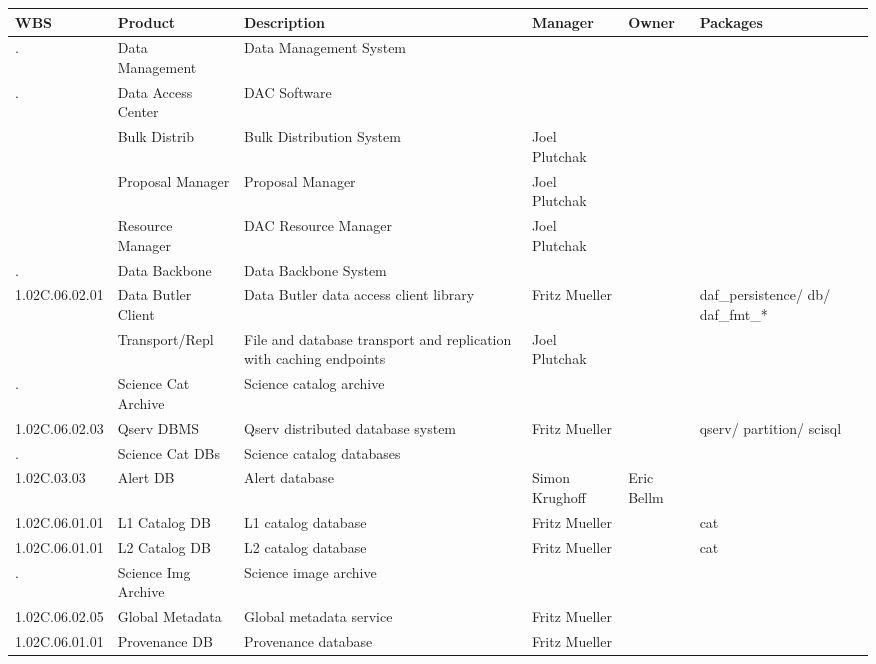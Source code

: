 \tiny 
\begin{longtable}{|p{}|p{}|p{}|p{}|p{}|p{}|}\hline 
 \bf WBS & Product & Description & Manager & Owner & Packages\\ \hline   
. &  Data Management & Data Management System &  &  & \\ \hline 
. &  Data Access Center & DAC Software &  &  & \\ \hline 
 &  Bulk Distrib & Bulk Distribution System & Joel Plutchak &  & \\ \hline 
 &  Proposal Manager & Proposal Manager & Joel Plutchak &  & \\ \hline 
 &  Resource Manager & DAC Resource Manager & Joel Plutchak &  & \\ \hline 
. &  Data Backbone & Data Backbone System &  &  & \\ \hline 
1.02C.06.02.01 &  Data Butler Client & Data Butler data access client library & Fritz Mueller &  & daf\_persistence/ db/ daf\_fmt\_*\\ \hline 
 &  Transport/Repl & File and database transport and replication with caching endpoints & Joel Plutchak &  & \\ \hline 
. &  Science Cat Archive & Science catalog archive &  &  & \\ \hline 
1.02C.06.02.03 &  Qserv DBMS & Qserv distributed database system & Fritz Mueller &  & qserv/ partition/ scisql\\ \hline 
. &  Science Cat DBs & Science catalog databases &  &  & \\ \hline 
1.02C.03.03 &  Alert DB & Alert database & Simon Krughoff & Eric Bellm & \\ \hline 
1.02C.06.01.01 &  L1 Catalog DB & L1 catalog database & Fritz Mueller &  & cat\\ \hline 
1.02C.06.01.01 &  L2 Catalog DB & L2 catalog database & Fritz Mueller &  & cat\\ \hline 
. &  Science Img Archive & Science image archive &  &  & \\ \hline 
1.02C.06.02.05 &  Global Metadata & Global metadata service & Fritz Mueller &  & \\ \hline 
1.02C.06.01.01 &  Provenance DB & Provenance database & Fritz Mueller &  & \\ \hline 

\end{longtable}
